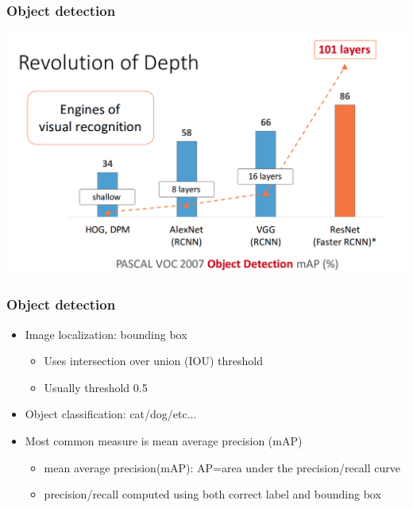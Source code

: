 \documentclass{beamer}
\begin{document}
\begin{frame}
	\frametitle{Object detection}
	\begin{center}
        \includegraphics[width=\textwidth]{figs/object-detect.png}
    \end{center}
	

\end{frame}
\begin{frame}
	\frametitle{Object detection}
\begin{itemize}
	\item Image localization: bounding box
	\begin{itemize}
		\item Uses intersection over union (IOU) threshold
		\item Usually threshold 0.5
	\end{itemize}
	
	\item Object classification: cat/dog/etc...
	\item Most common measure is mean average precision (mAP)
	\begin{itemize}
		\item mean average precision(mAP): AP=area under the precision/recall curve
		\item precision/recall computed using both correct label and bounding box
	\end{itemize}
\end{itemize}
	

\end{frame}
\end{document}
